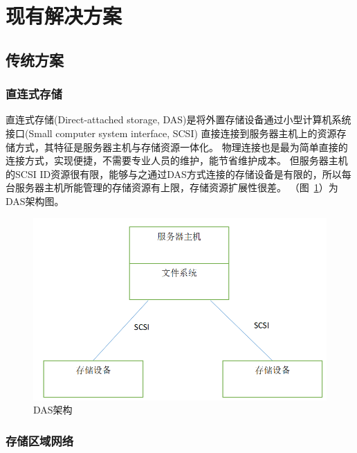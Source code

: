 \section{现有解决方案}
\subsection{传统方案}
\subsubsection{直连式存储}
直连式存储(Direct-attached storage, DAS)是将外置存储设备通过小型计算机系统接口(Small computer system interface, SCSI)
直接连接到服务器主机上的资源存储方式，其特征是服务器主机与存储资源一体化。
物理连接也是最为简单直接的连接方式，实现便捷，不需要专业人员的维护，能节省维护成本。
但服务器主机的SCSI ID资源很有限，能够与之通过DAS方式连接的存储设备是有限的，所以每台服务器主机所能管理的存储资源有上限，存储资源扩展性很差。
（图~\ref{fig:das_architecture}）为DAS架构图。

\begin{figure}
\centering
\includegraphics[scale=0.45]{Figures/storage/das_architecture.jpg}
\decoRule
\caption{DAS架构}
\label{fig:das_architecture}
\end{figure}

\subsubsection{存储区域网络}

